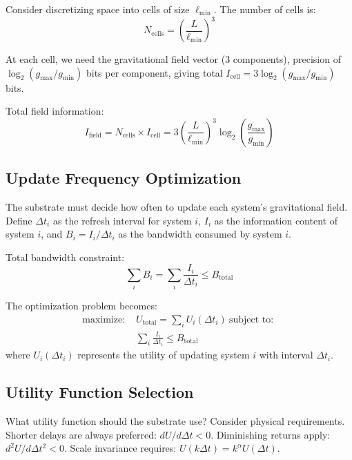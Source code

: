 \documentclass[twocolumn,prd,amsmath,amssymb,aps,superscriptaddress,nofootinbib]{revtex4-2}
\begin{document}
Consider discretizing space into cells of size $\ell_{\text{min}}$. The number of cells is:
\begin{equation}
N_{\text{cells}} = \left(\frac{L}{\ell_{\text{min}}}\right)^3
\end{equation}

At each cell, we need the gravitational field vector (3 components), precision of $\log_2(g_{\text{max}}/g_{\text{min}})$ bits per component, giving total $I_{\text{cell}} = 3 \log_2(g_{\text{max}}/g_{\text{min}})$ bits.

Total field information:
\begin{equation}
I_{\text{field}} = N_{\text{cells}} \times I_{\text{cell}} = 3\left(\frac{L}{\ell_{\text{min}}}\right)^3 \log_2\left(\frac{g_{\text{max}}}{g_{\text{min}}}\right)
\end{equation}

\subsection{Update Frequency Optimization}

The substrate must decide how often to update each system's gravitational field. Define $\Delta t_i$ as the refresh interval for system $i$, $I_i$ as the information content of system $i$, and $B_i = I_i/\Delta t_i$ as the bandwidth consumed by system $i$.

Total bandwidth constraint:
\begin{equation}
\sum_i B_i = \sum_i \frac{I_i}{\Delta t_i} \leq B_{\text{total}}
\end{equation}

The optimization problem becomes:
\begin{align}
\text{maximize: } & U_{\text{total}} = \sum_i U_i(\Delta t_i) \
\text{subject to: }\\ & \sum_i \frac{I_i}{\Delta t_i} \leq B_{\text{total}}
\end{align}
where $U_i(\Delta t_i)$ represents the utility of updating system $i$ with interval $\Delta t_i$.

\subsection{Utility Function Selection}

What utility function should the substrate use? Consider physical requirements. Shorter delays are always preferred: $dU/d\Delta t < 0$. Diminishing returns apply: $d^2U/d\Delta t^2 < 0$. Scale invariance requires: $U(k\Delta t) = k^\alpha U(\Delta t)$.
\end{document}
